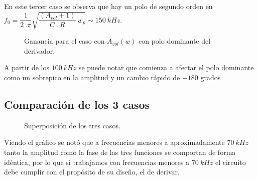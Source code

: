 \documentclass[11pt, a4paper]{article}
\begin{document}
En este tercer caso se observa que hay un polo de segundo orden en $f_0 = \dfrac{1}{2 \ . \pi} \sqrt{\dfrac{(A_{vol}+1)}{C \ . \ R} \ w_p} \sim 150 \ kHz$.

\begin{figure}[h!]
	\begin{center}
		\label{avolpolodominantederivador}
		\caption{Ganancia para el caso con $A_{vol}(w)$ con polo dominante del derivador.}
	\end{center}
\end{figure}

A partir de los $100 \ kHz$ se puede notar que comienza a afectar el polo dominante como un sobrepico en la amplitud y un cambio rápido de $-180$ grados

\subsection{Comparación de los 3 casos}
\begin{figure}[h!]
	\begin{center}
		\label{avolpolodominante}
		\caption{Superposición de los tres casos.}
	\end{center}
\end{figure}
Viendo el gráfico se notó que a frecuencias menores a aproximadamente $70 \ kHz$ tanto la amplitud como la fase de las tres funciones se comportan de forma idéntica, por lo que si trabajamos con frecuencias menores a $70 \ kHz$ el circuito debe cumplir con el propósito de su diseño, el de derivar.
\end{document}
